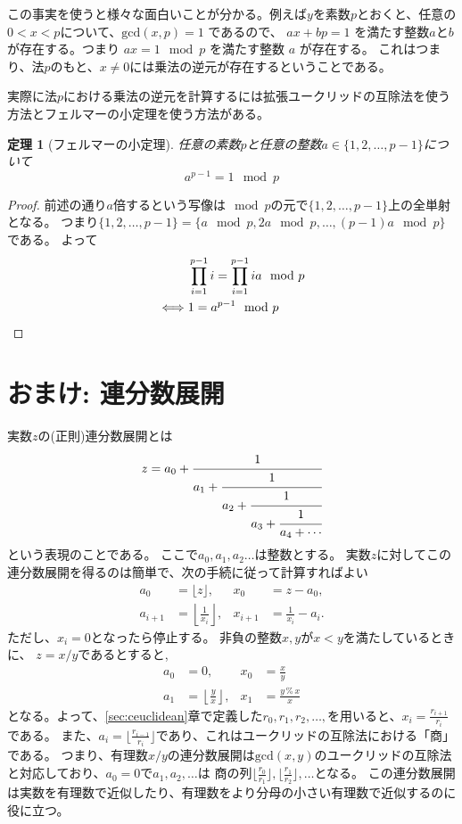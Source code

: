 \documentclass[a4paper,oneside,onecolumn,openany,article,10pt]{memoir}
\newtheorem{theorem}{定理}
\theoremstyle{remark}
\begin{document}
この事実を使うと様々な面白いことが分かる。例えば$y$を素数$p$とおくと、任意の$0< x < p$について、$\mathrm{gcd}(x, p) = 1$ であるので、
$ax + bp = 1$ を満たす整数$a$と$b$が存在する。つまり $ax = 1 \mod p$ を満たす整数 $a$ が存在する。
これはつまり、法$p$のもと、$x\ne 0$には乗法の逆元が存在するということである。

実際に法$p$における乗法の逆元を計算するには拡張ユークリッドの互除法を使う方法とフェルマーの小定理を使う方法がある。
\begin{theorem}[フェルマーの小定理]
任意の素数$p$と任意の整数$a\in\{1,2,\dotsc,p-1\}$について
\begin{equation*}
a^{p-1} = 1 \mod p
\end{equation*}
\end{theorem}
\begin{proof}
前述の通り$a$倍するという写像は$\mod p$の元で$\{1,2,\dotsc,p-1\}$上の全単射となる。
つまり$\{1,2,\dotsc,p-1\}=\{a \mod p,2a \mod p,\dotsc,(p-1)a \mod p\}$である。
よって
\begin{align*}
&\prod_{i=1}^{p-1} i = \prod_{i=1}^{p-1} i a \mod p\\
\iff &1 = a^{p-1} \mod p
\qedhere
\end{align*}
\end{proof}
\fi


\section{おまけ: 連分数展開}
実数$z$の(正則)連分数展開とは
\begin{equation*}
z=a_0 + \cfrac1{a_1+\cfrac1{a_2+\cfrac1{a_3+\cfrac1{a_4+\dotsb}}}}
\end{equation*}
という表現のことである。
ここで$a_0,a_1,a_2\dotsc$は整数とする。
実数$z$に対してこの連分数展開を得るのは簡単で、次の手続に従って計算すればよい
\begin{align*}
a_0 &= \lfloor z\rfloor,&
x_0 &= z-a_0,\\
a_{i+1} &= \left\lfloor \frac1{x_i}\right\rfloor,&
x_{i+1} &= \frac1{x_i} - a_i.
\end{align*}
ただし、$x_i=0$となったら停止する。
非負の整数$x, y$が$x< y$を満たしているときに、 $z=x/y$であるとすると,
\begin{align*}
a_0 &= 0,& x_0 &= \frac{x}{y}\\
a_1 &= \left\lfloor \frac{y}{x} \right\rfloor,&
x_1 &= \frac{y\,\%\,x}{x}
\end{align*}
となる。よって、\ref{sec:ceuclidean}章で定義した$r_0,r_1,r_2,\dotsc,$を用いると、$x_i = \frac{r_{i+1}}{r_i}$である。
また、$a_i = \lfloor\frac{r_{i-1}}{r_i}\rfloor$であり、これはユークリッドの互除法における「商」である。
つまり、有理数$x/y$の連分数展開は$\mathrm{gcd}(x, y)$のユークリッドの互除法と対応しており、$a_0=0$で$a_1,a_2,\dotsc$は
商の列$\lfloor\frac{r_{0}}{r_1}\rfloor,\lfloor\frac{r_{1}}{r_2}\rfloor,\dotsc$となる。
この連分数展開は実数を有理数で近似したり、有理数をより分母の小さい有理数で近似するのに役に立つ。
\end{document}
